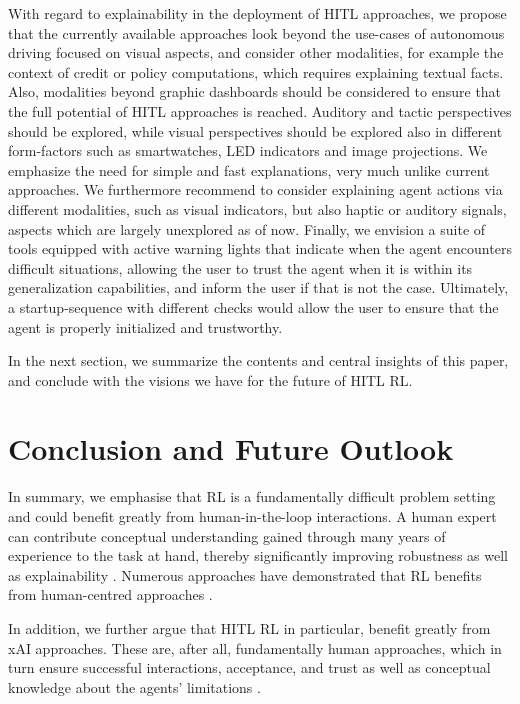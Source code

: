 \documentclass[twoside,11pt]{article}
\begin{document}
With regard to explainability in the deployment of HITL approaches, we propose that the currently available approaches look beyond the use-cases of autonomous driving focused on visual aspects, and consider other modalities, for example the context of credit or policy computations, which requires explaining textual facts. Also, modalities beyond graphic dashboards should be considered to ensure that the full potential of HITL approaches is reached. Auditory and tactic perspectives should be explored, while visual perspectives should be explored also in different form-factors such as smartwatches, LED indicators and image projections.
We emphasize the need for simple and fast explanations, very much unlike current approaches. We furthermore recommend to consider explaining agent actions via different modalities, such as visual indicators, but also haptic or auditory signals, aspects which are largely unexplored as of now. Finally, we envision a suite of tools equipped with active warning lights that indicate when the agent encounters difficult situations, allowing the user to trust the agent when it is within its generalization capabilities, and inform the user if that is not the case. Ultimately, a startup-sequence with different checks would allow the user to ensure that the agent is properly initialized and trustworthy.

In the next section, we summarize the contents and central insights of this paper, and conclude with the visions we have for the future of HITL RL.

\section{Conclusion and Future Outlook}
\label{sec:conclusion}
In summary, we emphasise that RL is a fundamentally difficult problem setting and could benefit greatly from human-in-the-loop interactions. A human expert can contribute conceptual understanding gained through many years of experience to the task at hand, thereby significantly improving robustness as well as explainability \citep{Holzinger:2021:TrustAI}. Numerous approaches have demonstrated that RL benefits from human-centred approaches \citep{Li:2019:HumanCenteredRLSurvey,MatthewsonPilarski:2022:DesigningAndEvaluatingHCIML}.

In addition, we further argue that HITL RL in particular, benefit greatly from xAI approaches. These are, after all, fundamentally human approaches, which in turn ensure successful interactions, acceptance, and trust as well as conceptual knowledge about the agents' limitations \citep{heuillet2021explainability,milani2022survey}.
\end{document}
